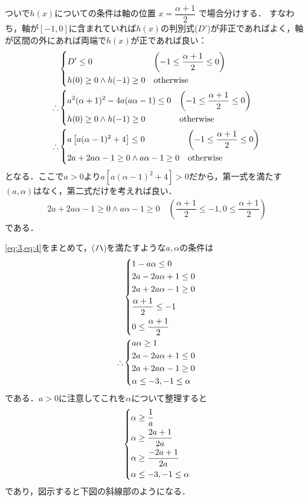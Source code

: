 \documentclass[../../main.tex]{subfiles}
\begin{document}
ついで$h(x)$についての条件は軸の位置 $x = \dfrac{\alpha+1}{2}$ で場合分けする．
すなわち，軸が$[-1,0]$に含まれていれば$h(x)$の判別式($D'$)が非正であればよく，軸が区間の外にあれば両端で$h(x)$が正であれば良い：
\begin{align}
  &
  \begin{dcases}
    D'\le 0 & \left(-1 \le \dfrac{\alpha+1}{2} \le 0\right) \\
    h(0)\ge 0 \land h(-1)\ge 0 & \text{otherwise}
  \end{dcases} \\
  \therefore
  &
  \begin{dcases}
    a^2(\alpha+1)^2-4a(a\alpha-1)\le 0 & \left(-1 \le \dfrac{\alpha+1}{2} \le 0\right) \\
    h(0)\ge 0 \land h(-1)\ge 0 & \text{otherwise}
  \end{dcases} \\
  \therefore
  &
  \begin{dcases}
    a\left[a(\alpha-1)^2+4\right]\le 0       & \left(-1 \le \dfrac{\alpha+1}{2} \le 0\right) \\
    2a+2a\alpha-1\ge 0 \land a\alpha-1 \ge 0 & \text{otherwise}
  \end{dcases}
\end{align}
となる．ここで$a>0$より$a\left[a(\alpha-1)^2+4\right]>0$だから，第一式を満たす$(a,\alpha)$はなく，第二式だけを考えれば良い．
\begin{align}
  2a+2a\alpha-1\ge 0 \land a\alpha-1 \ge 0 \quad \left(\dfrac{\alpha+1}{2} \le -1, 0 \le \dfrac{\alpha+1}{2}\right) \label{eq:4}
\end{align}
である．

\cref{eq:3,eq:4}をまとめて，(ハ)を満たすような$a,\alpha$の条件は
\begin{align}
  &
  \begin{dcases}
    1-a\alpha \le 0 \\
    2a-2a\alpha+1 \le 0 \\
    2a+2a\alpha-1 \ge 0 \\
    \dfrac{\alpha+1}{2} \le -1 \\
    0 \le \dfrac{\alpha+1}{2}
  \end{dcases} \\
  \therefore
  &
  \begin{dcases}
    a\alpha \ge 1 \\
    2a-2a\alpha+1 \le 0 \\
    2a+2a\alpha-1 \ge 0 \\
    \alpha \le -3, -1 \le \alpha
  \end{dcases}
\end{align}
である．$a>0$に注意してこれを$\alpha$について整理すると
\begin{align}
  \begin{dcases}
    \alpha \ge \dfrac{1}{a} \\
    \alpha \ge \dfrac{2a+1}{2a} \\
    \alpha \ge \dfrac{-2a+1}{2a} \\
    \alpha \le -3, -1 \le \alpha
  \end{dcases}
\end{align}
であり，図示すると下図の斜線部のようになる．
\end{document}
